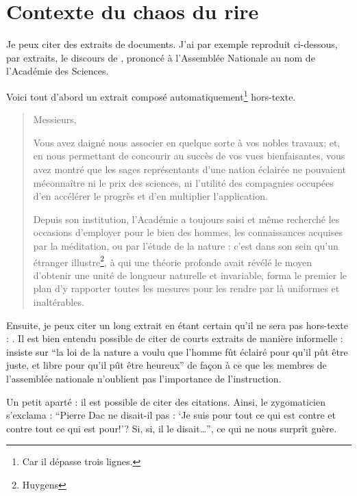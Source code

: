 \chapter{Contexte du chaos du rire}

Je peux citer des extraits de
documents. J'ai par exemple reproduit ci-dessous, par extraits, le discours de
\citeauthor{cond}, prononcé à l'Assemblée Nationale au nom de l'Académie des
Sciences.

Voici tout d'abord un extrait composé automatiquement\footnote{Car il dépasse
  trois lignes.} \og hors-texte\fg{}.
%
\blockcquote[pp.~508-509]{cond}{%
  Messieurs,

  Vous avez daigné nous associer en quelque sorte à vos nobles
  travaux; et, en nous permettant de concourir au succès de vos vues
  bienfaisantes, vous avez montré que les sages représentants d'une
  nation éclairée ne pouvaient méconnaître ni le prix des sciences, ni
  l'utilité des compagnies occupées d'en accélérer le progrès et d'en
  multiplier l'application.

  Depuis son institution, l'Académie a toujours saisi et même
  recherché les occasions d'employer pour le bien des hommes, les
  connaissances acquises par la méditation, ou par l'étude de la
  nature : c'est dans son sein qu'un étranger
  illustre\footnote{Huygens}, à qui une théorie profonde avait révélé
  le moyen d'obtenir une unité de longueur naturelle et invariable,
  forma le premier le plan d'y rapporter toutes les mesures pour les
  rendre par là uniformes et inaltérables.
}

Ensuite, je peux citer un long extrait en étant certain qu'il ne
sera pas \og hors-texte\fg{} :
. Il est bien entendu possible de citer de courts extraits
de manière informelle : \citeauthor{cond}
insiste sur \enquote{la loi de la nature a voulu que
  l'homme fût éclairé pour qu'il pût être juste, et libre pour qu'il
  pût être heureux} de façon à ce que les membres de l'assemblée
nationale n'oublient pas l'importance de l'instruction.

Un petit aparté : il est possible de citer des
citations. Ainsi, le zygomaticien
s'exclama : \enquote{Pierre Dac ne disait-il pas : \enquote{Je suis
    pour tout ce qui est contre et contre tout ce qui est pour!}?
  Si, si, il le disait\ldots{}}, ce qui ne nous surprît guère.

